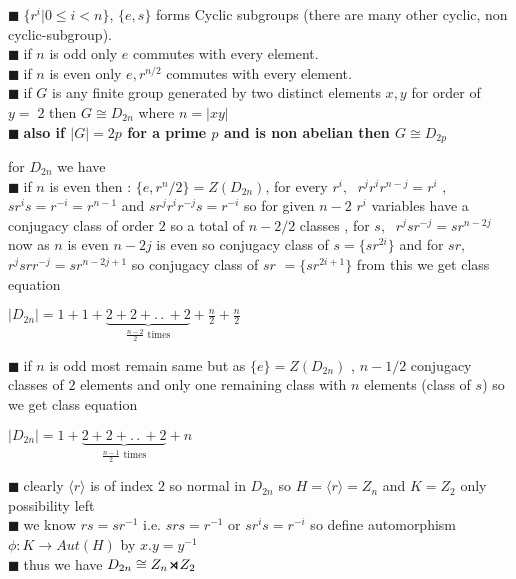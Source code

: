 \documentclass[11pt]{extarticle}
\newcommand{\ra}{\rightarrow}
\newcommand{\w}[1]{\text{#1}}
\newcommand{\ck}{.\,.\,}
\newcommand{\y}{$\blacksquare\;$}
\newcommand{\smdp}{ \,
\begin{tikzpicture}
	\draw[thick] (0,0)--(1ex,1ex)--(1ex,0)--(0,1ex);
\end{tikzpicture} 
\,
}
\newcommand{\gen}[1]{\langle #1 \rangle}
\newcommand{\tbx}[2][]{
	\begin{tcolorbox}[enhanced,breakable,size=small,colback=black!2!white,title={#1},arc is angular, arc=1.5mm,drop fuzzy shadow]
		#2
	\end{tcolorbox}
}
\begin{document}
\begin{multicols}{2}
	\tbx[Properties of $D_{2n}$ ]{
			\y  $\{r^i|0\leq i<n\}$, $\{e,s\}$ forms Cyclic subgroups (there are many other cyclic,  
			non cyclic-subgroup).\\
			\y  if $n$ is odd only $e$ commutes with every element. \\
			\y  if $n$ is even only $e,r^{n/2}$ commutes with every element. \\
			\y  if $G$ is any finite group generated by two distinct elements $x,y$ for order of $ y =\;2$ then $G\cong D_{2n}$ where $n=|xy|$ \\
			\y \textbf{also if $ |G|=2p $ for a prime $ p $ and is non abelian then $ G\cong D_{2p} $  }}

\tbx[Class equation]{ \footnotesize for $ D_{2n} $ we have \\
\y if $ n $ is even then : $ \{e,r^n/2\}=Z(D_{2n}) $, for every $ r^i,\; $ $ r^j r^i r^{n-j}=r^i $ , $ sr^is=r^{-i}=r^{n-1} $ and $ sr^jr^i r^{-j}s=r^{-i} $ so for given $ n-2 $ $ r^i $ variables have a conjugacy class of order $ 2 $ so a total of $ n-2/2 $ classes , for $ s,\; $ $ r^jsr^{-j}=sr^{n-2j} $ now as $ n $ is even $ n-2j $ is even so conjugacy class of $ s  =\{sr^{2i}\} $ and for $ sr,\;$ $ r^jsrr^{-j} =sr^{n-2j+1}$ so conjugacy class of $ sr $ $ =\{sr^{2i+1}\} $ from this we get class equation
\begin{center}
	$ |D_{2n}|=1+1 +\underbrace{2+2+\ck+2}_{\frac{ n-2 }{2} \w{ times}}+\frac{ n }{2} +\frac{ n }{2} $
	\end{center}   
\y if $ n $ is odd most remain same but  as $ \{e\}=Z(D_{2n}) $ , $ n-1/2 $ conjugacy classes of $2$ elements and only one remaining class with $ n $  elements (class of $ s $) so we get class equation
\begin{center}
	$ |D_{2n}|=1+\underbrace{2+2+\ck+2}_{\frac{ n-1 }{2} \w{ times}}+{ n }$
\end{center}   
}
\tbx[Semi direct product construction of $ D_{2n}=H\smdp K $  ]{ \y clearly $ \gen{r} $ is of index $ 2 $ so normal in $ D_{2n} $ so $ H=\gen{r}= Z_n$ and $ K=Z_2 $ only possibility left\\
\y  we know $ rs=sr^{-1} $ i.e. $ srs=r^{-1} $ or $ sr^is=r^{-i} $ so define automorphism $ \phi : K\ra Aut(H)  $ by $x.y=y^{-1}  $ \\
\y thus we have $ D_{2n}\cong Z_n\smdp Z_2 $ }

\newcolumn

\end{multicols}
\end{document}
